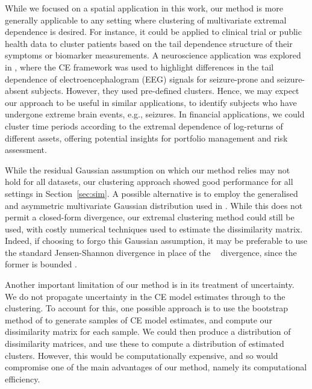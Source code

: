 \documentclass[preprint,12pt,authoryear]{elsarticle}
\newcommand{\JSGa}{\mathop{\mathrm{JS}^{\mathrm{G}_{\lambda}}}\nolimits}
\begin{document}
While we focused on a spatial application in this work, our method is more generally applicable to any setting where clustering of multivariate extremal dependence is desired.
For instance, it could be applied to clinical trial or public health data to cluster patients based on the tail dependence structure of their symptoms or biomarker measurements.
A neuroscience application was explored in \citet{Talento2025}, where the CE framework was used to highlight differences in the tail dependence of electroencephalogram (EEG) signals for seizure-prone and seizure-absent subjects. 
However, they used pre-defined clusters. Hence, we may expect our approach to be useful in similar applications, to identify subjects who have undergone extreme brain events, e.g., seizures.
In financial applications, we could cluster time periods according to the extremal dependence of log-returns of different assets, offering potential insights for portfolio management and risk assessment.

While the residual Gaussian assumption on which our method relies may not hold for all datasets, our clustering approach showed good performance for all settings in Section~\ref{sec:sim}.
A possible alternative is to employ the generalised and asymmetric multivariate Gaussian distribution used in \citet{Farrell2025}. 
While this does not permit a closed-form divergence, our extremal clustering method could still be used, with costly numerical techniques used to estimate the dissimilarity matrix.
Indeed, if choosing to forgo this Gaussian assumption, it may be preferable to use the standard Jensen-Shannon divergence in place of the $\JSGa{}$ divergence, since the former is bounded \citep{Thiagarajan2025}.

Another important limitation of our method is in its treatment of uncertainty.
We do not propagate uncertainty in the CE model estimates through to the clustering. 
To account for this, one possible approach is to use the bootstrap method of \citet{Heffernan2004} to generate samples of CE model estimates, and compute our dissimilarity matrix for each sample. 
We could then produce a distribution of dissimilarity matrices, and use these to compute a distribution of estimated clusters.
However, this would be computationally expensive, and so would compromise one of the main advantages of our method, namely its computational efficiency.
\end{document}
